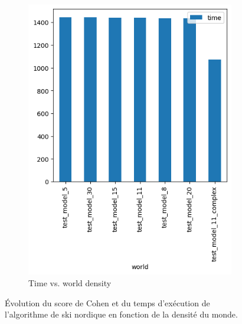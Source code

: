 \documentclass[francais,RandD]{rapportPFE}
\begin{document}
\begin{figure}[h!]
\begin{subfigure}[t]{0.49\linewidth}
					\includegraphics[width=\linewidth]{graphics/ski_nordique-time_vs_world.png}
					\caption{Time vs. world density}
					\label{fig:ski_nordique-time_vs_world}
			\end{subfigure}
			\caption{Évolution du score de Cohen et du temps d'exécution de l'algorithme de ski nordique en fonction de la densité du monde.}
			\label{fig:ski_nordique-world}
		\end{figure}
\end{document}
